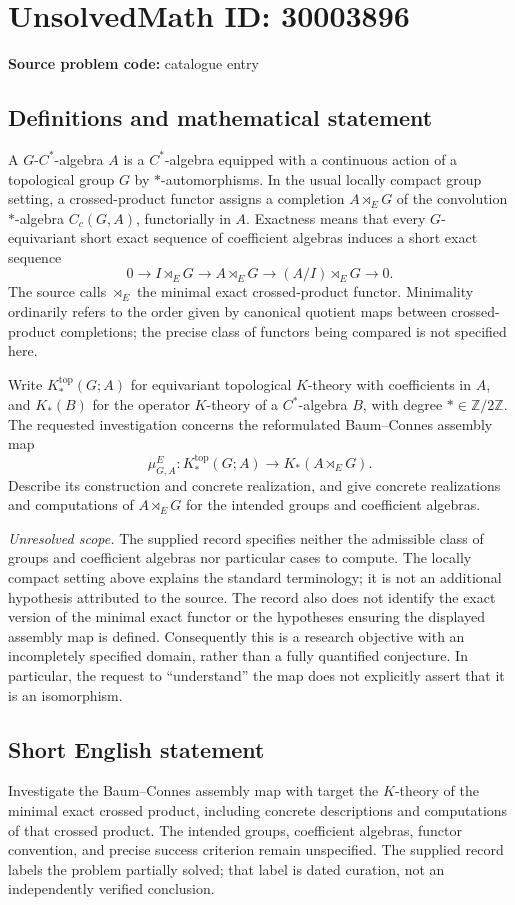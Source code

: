 \documentclass[11pt]{article}
\newcommand{\Z}{\mathbb{Z}}
\begin{document}
\section*{UnsolvedMath ID: 30003896}
\textbf{Source problem code:} catalogue entry
\subsection{Definitions and mathematical statement}
A \(G\)-\(C^*\)-algebra \(A\) is a \(C^*\)-algebra equipped with a continuous action of a topological group \(G\) by \(*\)-automorphisms. In the usual locally compact group setting, a crossed-product functor assigns a completion \(A\rtimes_E G\) of the convolution \(*\)-algebra \(C_c(G,A)\), functorially in \(A\). Exactness means that every \(G\)-equivariant short exact sequence of coefficient algebras induces a short exact sequence
\[
0\longrightarrow I\rtimes_E G\longrightarrow A\rtimes_E G\longrightarrow (A/I)\rtimes_E G\longrightarrow 0.
\]
The source calls \(\rtimes_E\) the minimal exact crossed-product functor. Minimality ordinarily refers to the order given by canonical quotient maps between crossed-product completions; the precise class of functors being compared is not specified here.

Write \(K_*^{\mathrm{top}}(G;A)\) for equivariant topological \(K\)-theory with coefficients in \(A\), and \(K_*(B)\) for the operator \(K\)-theory of a \(C^*\)-algebra \(B\), with degree \(*\in\Z/2\Z\). The requested investigation concerns the reformulated Baum--Connes assembly map
\[
\mu^E_{G,A}\colon K_*^{\mathrm{top}}(G;A)\longrightarrow K_*(A\rtimes_E G).
\]
Describe its construction and concrete realization, and give concrete realizations and computations of \(A\rtimes_E G\) for the intended groups and coefficient algebras.

\textit{Unresolved scope.} The supplied record specifies neither the admissible class of groups and coefficient algebras nor particular cases to compute. The locally compact setting above explains the standard terminology; it is not an additional hypothesis attributed to the source. The record also does not identify the exact version of the minimal exact functor or the hypotheses ensuring the displayed assembly map is defined. Consequently this is a research objective with an incompletely specified domain, rather than a fully quantified conjecture. In particular, the request to ``understand'' the map does not explicitly assert that it is an isomorphism.
\subsection{Short English statement}
Investigate the Baum--Connes assembly map with target the \(K\)-theory of the minimal exact crossed product, including concrete descriptions and computations of that crossed product. The intended groups, coefficient algebras, functor convention, and precise success criterion remain unspecified. The supplied record labels the problem partially solved; that label is dated curation, not an independently verified conclusion.
\end{document}

